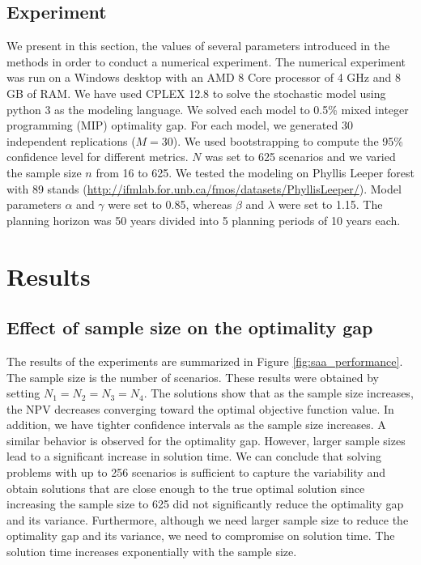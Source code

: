 \documentclass[forests,article,submit,moreauthors,pdftex]{Definitions/mdpi}
\begin{document}
\subsection{Experiment}

We present in this section, the values of several parameters introduced in the methods in order to conduct a numerical experiment. The numerical experiment was run on a Windows desktop with an AMD 8 Core processor of 4 GHz and 8 GB of RAM. We have used CPLEX 12.8 to solve the stochastic model using python 3 as the modeling language. We solved each model to 0.5\% mixed integer programming (MIP) optimality gap. For each model, we generated 30 independent replications ($M = 30$). We used bootstrapping to compute the 95\% confidence level for different metrics.  $N$ was set to 625 scenarios and we varied the sample size $n$ from 16 to 625.
We tested the modeling on Phyllis Leeper forest with 89 stands (\url{http://ifmlab.for.unb.ca/fmos/datasets/PhyllisLeeper/}). Model parameters $\alpha$ and $\gamma$  were set to 0.85, whereas $\beta$ and $\lambda$ were set to 1.15. The planning horizon was 50 years divided into 5 planning periods of 10 years each.

\section{Results} \label{sec:num_res}

\subsection{Effect of sample size on the optimality gap} \label{sec:sampl_size_effect}

The results of the experiments are summarized in Figure \ref{fig:saa_performance}. The sample size is the number of scenarios. These results were obtained by setting $N_1=N_2=N_3=N_4$. 
The solutions show that as the sample size increases, the NPV decreases converging toward the optimal objective function value. In addition, we have tighter confidence intervals as the sample size increases. A similar behavior is observed for the optimality gap. However, larger sample sizes lead to a significant increase in solution time.  We can conclude that solving problems with up to 256 scenarios is sufficient to capture the variability and obtain solutions that are close enough to the true optimal solution since increasing the sample size to 625 did not significantly reduce the optimality gap and its variance. Furthermore, although we need larger sample size  to reduce the optimality gap and its variance, we need to compromise on solution time. The solution time increases exponentially with the sample size.
\end{document}
